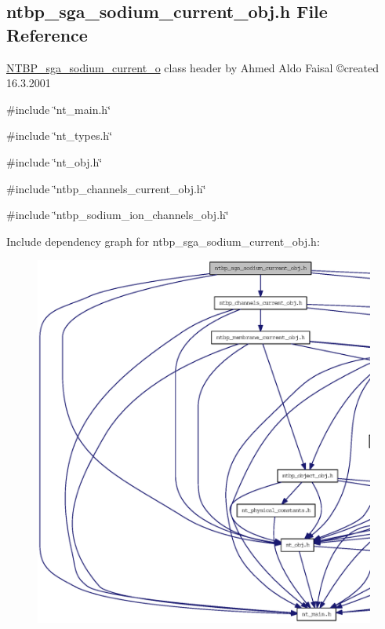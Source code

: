 \subsection{ntbp\_\-sga\_\-sodium\_\-current\_\-obj.h File Reference}
\label{ntbp__sga__sodium__current__obj_8h}



\begin{DoxyItemize}
\item \hyperlink{class_n_t_b_p__sga__sodium__current__o}{NTBP\_\-sga\_\-sodium\_\-current\_\-o} class header by Ahmed Aldo Faisal \copyright created 16.3.2001 
\end{DoxyItemize} 


{\ttfamily \#include \char`\"{}nt\_\-main.h\char`\"{}}\par
{\ttfamily \#include \char`\"{}nt\_\-types.h\char`\"{}}\par
{\ttfamily \#include \char`\"{}nt\_\-obj.h\char`\"{}}\par
{\ttfamily \#include \char`\"{}ntbp\_\-channels\_\-current\_\-obj.h\char`\"{}}\par
{\ttfamily \#include \char`\"{}ntbp\_\-sodium\_\-ion\_\-channels\_\-obj.h\char`\"{}}\par
Include dependency graph for ntbp\_\-sga\_\-sodium\_\-current\_\-obj.h:
\nopagebreak
\begin{figure}[H]
\begin{center}
\leavevmode
\includegraphics[width=400pt]{ntbp__sga__sodium__current__obj_8h__incl}
\end{center}
\end{figure}
